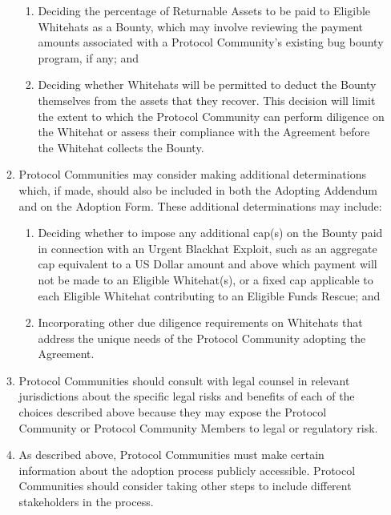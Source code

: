 \begin{enumerate}
\begin{enumerate}[label=\alph*.]
\begin{enumerate}[label=\roman*.]
                        \item Deciding the percentage of Returnable Assets to be paid to Eligible Whitehats as a Bounty, which may involve reviewing the payment amounts associated with a Protocol Community's existing bug bounty program, if any; and

                        \item Deciding whether Whitehats will be permitted to deduct the Bounty themselves from the assets that they recover. This decision will limit the extent to which the Protocol Community can perform diligence on the Whitehat or assess their compliance with the Agreement before the Whitehat collects the Bounty.
                    \end{enumerate}

              \item Protocol Communities may consider making additional determinations which, if made, should also be included in both the Adopting Addendum and on the Adoption Form. These additional determinations may include:


                    \begin{enumerate}[label=\roman*.]
                        \item Deciding whether to impose any additional cap(s) on the Bounty paid in connection with an Urgent Blackhat Exploit, such as an aggregate cap equivalent to a US Dollar amount and above which payment will not be made to an Eligible Whitehat(s), or a fixed cap applicable to each Eligible Whitehat contributing to an Eligible Funds Rescue; and

                        \item Incorporating other due diligence requirements on Whitehats that address the unique needs of the Protocol Community adopting the Agreement.
                    \end{enumerate}

              \item Protocol Communities should consult with legal counsel in relevant jurisdictions about the specific legal risks and benefits of each of the choices described above because they may expose the Protocol Community or Protocol Community Members to legal or regulatory risk.

              \item As described above, Protocol Communities must make certain information about the adoption process publicly accessible. Protocol Communities should consider taking other steps to include different stakeholders in the process.


\end{enumerate}
\end{enumerate}
